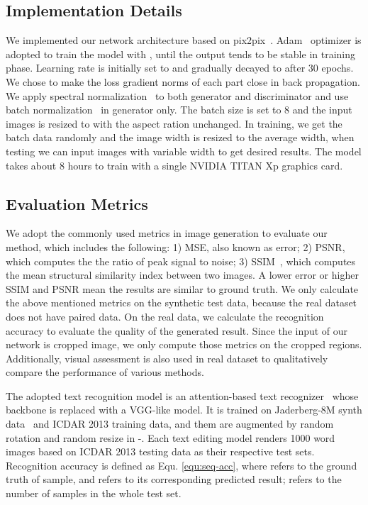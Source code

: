 \documentclass[sigconf]{acmart}
\begin{document}
\subsection{Implementation Details}
We implemented our network architecture based on pix2pix~\cite{isola2017image}. Adam~\cite{kingma2014adam} optimizer is adopted to train the model with ,  until the output tends to be stable in training phase. Learning rate is initially set to  and gradually decayed to  after 30 epochs. We chose  to make the loss gradient norms of each part close in back propagation. We apply spectral normalization~\cite{miyato2018spectral} to both generator and discriminator and use batch normalization~\cite{Ioffe2015Batch} in generator only. The batch size is set to 8 and the input images is resized to  with the aspect ration unchanged. In training, we get the batch data randomly and the image width is resized to the average width, when testing we can input images with variable width to get desired results. The model takes about 8 hours to train with a single NVIDIA TITAN Xp graphics card.

\subsection{Evaluation Metrics} 
We adopt the commonly used metrics in image generation to evaluate our method, which includes the following: 1) MSE, also known as  error; 2) PSNR, which computes the the ratio of peak signal to noise; 3) SSIM~\cite{wang2004image}, which computes the mean structural similarity index between two images. A lower  error or higher SSIM and PSNR mean the results are similar to ground truth. We only calculate the above mentioned metrics on the synthetic test data, because the real dataset does not have paired data. On the real data, we calculate the recognition accuracy to evaluate the quality of the generated result. Since the input of our network is cropped image, we only compute those metrics on the cropped regions. Additionally, visual assessment is also used in real dataset to qualitatively compare the performance of various methods.

The adopted text recognition model is an attention-based text recognizer~\cite{shi2018aster} whose backbone is replaced with a VGG-like model. It is trained on Jaderberg-8M synth data~\cite{Jaderberg14c} and ICDAR 2013 training data, and them are augmented by random rotation and random resize in -. 
Each text editing model renders 1000 word images based on ICDAR 2013 testing data as their respective test sets. Recognition accuracy is defined as Equ. \ref{equ:seq-acc}, where  refers to the ground truth of  sample, and  refers to its corresponding predicted result;  refers to the number of samples in the whole test set. 
\end{document}
